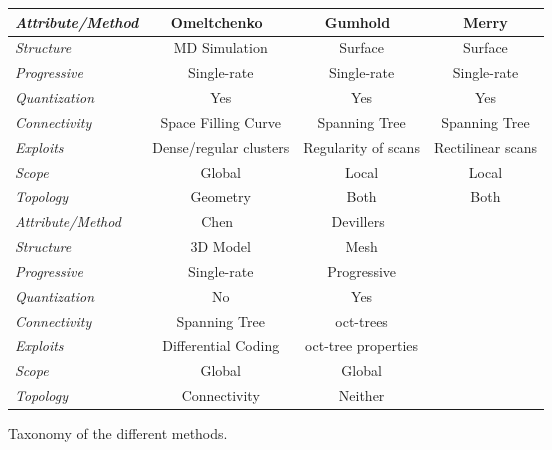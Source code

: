 \documentclass[11pt,twocolumn]{article}
\begin{document}
\begin{figure*}
\centering
\begin{tabular}{||l|c|c|c||}
  \hline

  \emph{Attribute/Method} & Omeltchenko~\cite{omeltchenko2000sls} &
  Gumhold~\cite{gumholdcomp} & Merry\cite{merrycomp} \\

  \hline

  \emph{Structure} & MD Simulation & Surface & Surface \\

  \emph{Progressive} & Single-rate & Single-rate & Single-rate \\

  \emph{Quantization} & Yes & Yes & Yes \\

  \emph{Connectivity} & Space Filling Curve & Spanning Tree & Spanning Tree \\

  \emph{Exploits} & Dense/regular clusters & Regularity of scans & Rectilinear
  scans \\

  \emph{Scope} & Global & Local & Local \\

  \emph{Topology} & Geometry & Both & Both \\

  \hline
  \hline

  \emph{Attribute/Method} & Chen~\cite{chen2005lcp} & Devillers~\cite{devillers2000gci} & \\

  \hline

  \emph{Structure} & 3D Model & Mesh & \\

  \emph{Progressive} & Single-rate & Progressive & \\

  \emph{Quantization} & No & Yes & \\

  \emph{Connectivity} & Spanning Tree & oct-trees & \\

  \emph{Exploits} & Differential Coding & oct-tree properties & \\

  \emph{Scope} & Global & Global & \\

  \emph{Topology} & Connectivity & Neither & \\

  \hline

\end{tabular}
\caption{Taxonomy of the different methods.}\label{fig:taxonomy}
\end{figure*}


\nocite{*}


\end{document}
